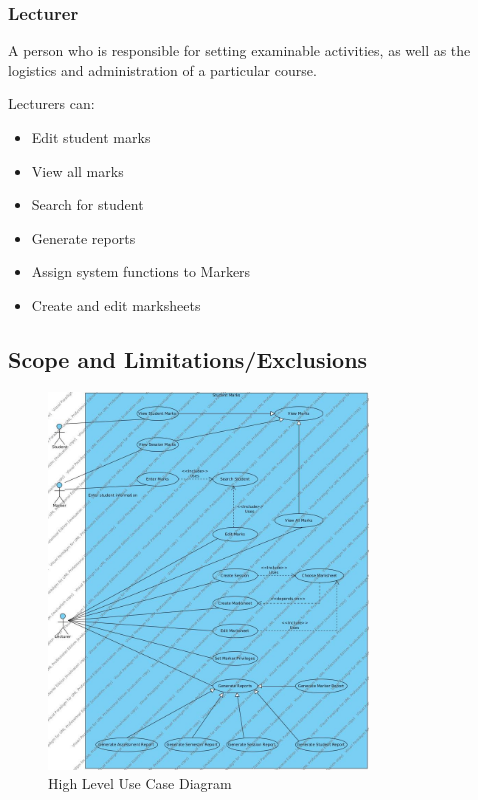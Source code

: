 \documentclass[a4paper]{article}
\begin{document}
			\subsubsection{Lecturer}
				\begin{flushleft}
				A person who is responsible for setting examinable activities, as well as the logistics and administration of a particular course. \linebreak 
				
				Lecturers can:
				\end{flushleft}
				\begin{itemize}

					\item{Edit student marks}
					
					\item{View all marks}
					
					\item{Search for student}
					
					\item{Generate reports}
					
					\item{Assign system functions to Markers}
					
					\item{Create and edit marksheets}

				\end{itemize}
			
		\subsection{Scope and Limitations/Exclusions}
			\begin{figure}[h]
				\caption{High Level Use Case Diagram}
				\includegraphics[height=10cm]{StudentMarks}
			\end{figure}
\end{document}
